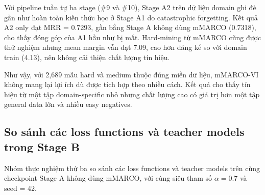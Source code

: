 \documentclass[../DoAn.tex]{subfiles}
\begin{document}
Với pipeline tuần tự ba stage (\#9 và \#10), Stage A2 trên dữ liệu domain ghi đè gần như hoàn toàn kiến thức học ở Stage A1 do catastrophic forgetting. Kết quả A2 only đạt MRR = 0.7293, gần bằng Stage A không dùng mMARCO (0.7318), cho thấy đóng góp của A1 hầu như bị mất. Hard-mining từ mMARCO cũng được thử nghiệm nhưng mean margin vẫn đạt 7.09, cao hơn đáng kể so với domain train (4.13), nên không cải thiện chất lượng tín hiệu.

Như vậy, với 2,689 mẫu hard và medium thuộc đúng miền dữ liệu, mMARCO-VI không mang lại lợi ích dù được tích hợp theo nhiều cách. Kết quả cho thấy tín hiệu từ một tập domain-specific nhỏ nhưng chất lượng cao có giá trị hơn một tập general data lớn và nhiều easy negatives.

\subsection{So sánh các loss functions và teacher models trong Stage B}
\label{subsection:5.2.3}

Nhóm thực nghiệm thứ ba so sánh các loss functions và teacher models trên cùng checkpoint Stage A không dùng mMARCO, với cùng siêu tham số $\alpha=0.7$ và seed = 42.
\end{document}
